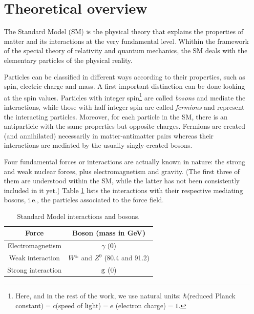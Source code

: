 \documentclass[a4paper,12pt]{article}
\begin{document}
\section{Theoretical overview}
\label{sec:theoretical}

The Standard Model (SM) is the physical theory that explains the properties of matter and its interactions at the very fundamental level. Whithin the framework of the special theory of relativity and quantum mechanics, the SM deals with the elementary particles of the physical reality.

Particles can be classified in different ways according to their properties, such as spin, electric charge and mass. A first important distinction can be done looking at the spin values. Particles with integer spin\footnote{Here, and in the rest of the work, we use natural units: $\hbar$(reduced Planck constant)$=c$(speed of light)$=e$ (electron charge)$=1$.} are called \textit{bosons} and mediate the interactions, while those with half-integer spin are called \textit{fermions} and represent the interacting particles. Moreover, for each particle in the SM, there is an antiparticle with the same properties but opposite charges. Fermions are created (and annihilated) necessarily in matter-antimatter pairs whereas their interactions are mediated by the usually singly-created bosons.

Four fundamental forces or interactions are actually known in nature: the strong and weak nuclear forces, plus electromagnetism and gravity. (The first three of them are understood within the SM, while the latter has not been consistently included in it yet.) Table \ref{table:SMBoson} lists the interactions with their respective mediating bosons, i.e., the particles associated to the force field. 


\begin{table}[!h]
\caption{Standard Model interactions and bosons.}\smallskip
\label{table:SMBoson}
\centering 

\begin{tabular}{cc}
\hline \hline  
\smallskip
Force& Boson (mass in GeV\cite{Beringer:1900zz}) \\ 
\hline
Electromagnetism & $\gamma$ (0) \\
Weak interaction & $W^\pm$ and $Z^0$ (80.4 and 91.2) \\
Strong interaction & ${\mathrm g}$ (0) \\
\end{tabular}
\end{table}
\end{document}
